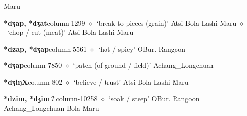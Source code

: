 \hspace{1ex}
         Maru 
  \item {\footnotesize \textbf{*dʒap, *dʒat}}{\tiny column-1299}
         $\diamond$~`break to pieces (grain)'
         Atsi 
\hspace{1ex}
         Bola 
\hspace{1ex}
         Lashi 
\hspace{1ex}
         Maru 
\hspace{1ex}
         $\diamond$~`chop / cut (meat)'
         Atsi 
\hspace{1ex}
         Bola 
\hspace{1ex}
         Lashi 
\hspace{1ex}
         Maru 
  \item {\footnotesize \textbf{*dzap, *dʒap}}{\tiny column-5561}
         $\diamond$~`hot / spicy'
         OBur. 
\hspace{1ex}
         Rangoon 
  \item {\footnotesize \textbf{*dʒap}}{\tiny column-7850}
         $\diamond$~`patch (of ground / field)'
         Achang\_Longchuan 
  \item {\footnotesize \textbf{*dʒiŋX}}{\tiny column-802}
         $\diamond$~`believe / trust'
         Atsi 
\hspace{1ex}
         Bola 
\hspace{1ex}
         Lashi 
\hspace{1ex}
         Maru 
  \item {\footnotesize \textbf{*dzim, *dʒim\,?\,}}{\tiny column-10258}
         $\diamond$~`soak / steep'
         OBur. 
\hspace{1ex}
         Rangoon 
\hspace{1ex}
         Achang\_Longchuan 
\hspace{1ex}
         Bola 
\hspace{1ex}
         Maru 
\hspace{1ex}
